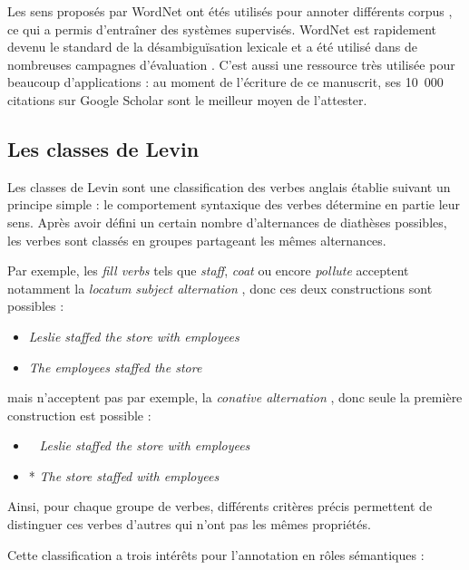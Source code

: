 Les sens proposés par WordNet ont étés utilisés pour annoter différents corpus
\citep{petrolito2014survey}, ce qui a permis d'entraîner des systèmes
supervisés. WordNet est rapidement devenu le standard de la désambiguïsation
lexicale et a été utilisé dans de nombreuses campagnes d'évaluation
\citep{navigli2009word}. C'est aussi une ressource très utilisée pour beaucoup
d'applications : au moment de l'écriture de ce manuscrit, ses 10~000 citations
sur Google Scholar sont le meilleur moyen de l'attester.

\subsection{Les classes de Levin}
\label{presentation_levin}

Les classes de Levin \citep{levin1993english} sont une classification des
verbes anglais établie suivant un principe simple : le comportement syntaxique
des verbes détermine en partie leur sens. Après avoir défini un certain nombre
d'alternances de diathèses possibles, les verbes sont classés en groupes
partageant les mêmes alternances.

Par exemple, les \emph{fill verbs} tels que \emph{staff}, \emph{coat} ou encore
\emph{pollute} \citep[p.~119]{levin1993english} acceptent notamment la
\emph{locatum subject alternation} \citep[p.~85]{levin1993english}, donc ces
deux constructions sont possibles :

\begin{itemize}
    \item \emph{Leslie staffed the store with employees}
    \item \emph{The employees staffed the store}
\end{itemize}

mais n'acceptent pas par exemple, la \emph{conative alternation}
\citep[p.~41]{levin1993english}, donc seule la première construction est
possible :

\begin{itemize}
    \item ~ \emph{Leslie staffed the store with employees}
    \item * \emph{The store staffed with employees}
\end{itemize}

Ainsi, pour chaque groupe de verbes, différents critères précis permettent de
distinguer ces verbes d'autres qui n'ont pas les mêmes propriétés.

Cette classification a trois intérêts pour l'annotation en rôles sémantiques :

